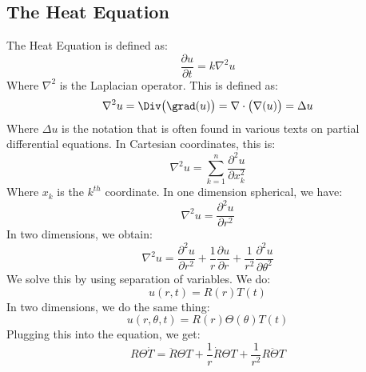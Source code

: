         \subsection{The Heat Equation}
            The Heat Equation is defined as:
            \begin{equation}
                \frac{\partial{u}}{\partial{t}}=
                k\nabla^{2}u
            \end{equation}
            Where $\nabla^{2}$ is the Laplacian operator. This
            is defined as:
            \begin{equation}
                \nabla^{2}u=\Div\big(\grad(u)\big)
                =\nabla\cdot\big(\nabla(u)\big)=\Delta{u}
            \end{equation}
            Where $\Delta{u}$ is the notation that is often
            found in various texts on partial differential
            equations. In Cartesian coordinates, this is:
            \begin{equation}
                \nabla^{2}u=\sum_{k=1}^{n}
                    \frac{\partial^{2}u}{\partial{x}_{k}^{2}}
            \end{equation}
            Where $x_{k}$ is the $k^{th}$ coordinate. In
            one dimension spherical, we have:
            \begin{equation}
                \nabla^{2}u=\frac{\partial^{2}u}{\partial{r}^{2}}
            \end{equation}
            In two dimensions, we obtain:
            \begin{equation}
                \nabla^{2}u=\frac{\partial^{2}u}{\partial{r}^{2}}+
                    \frac{1}{r}\frac{\partial{u}}{\partial{r}}+
                    \frac{1}{r^{2}}
                    \frac{\partial^{2}u}{\partial\theta^{2}}
            \end{equation}
            We solve this by using separation of variables.
            We do:
            \begin{equation}
                u(r,t)=R(r)T(t)
            \end{equation}
            In two dimensions, we do the same thing:
            \begin{equation}
                u(r,\theta,t)=R(r)\Theta(\theta)T(t)
            \end{equation}
            Plugging this into the equation, we get:
            \begin{equation}
                R\Theta\dot{T}=
                \ddot{R}\Theta{T}+\frac{1}{r}\dot{R}\Theta{T}+
                \frac{1}{r^{2}}R\ddot{\Theta}T
            \end{equation}

